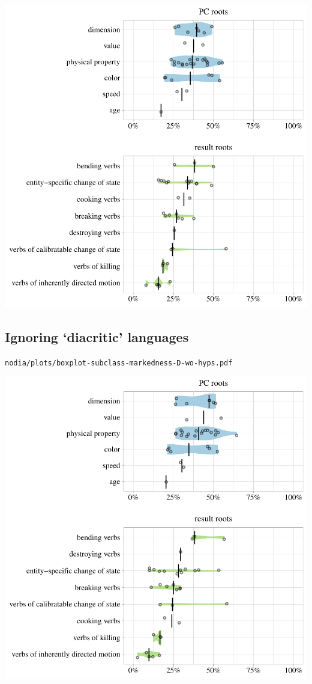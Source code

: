 \includegraphics[width=1.0\textwidth]{../nolow/plots/boxplot-subclass-markedness-D-wo-hyps.pdf}

\subsection{Ignoring `diacritic' languages}

\texttt{nodia/plots/boxplot-subclass-markedness-D-wo-hyps.pdf}

\includegraphics[width=1.0\textwidth]{../nodia/plots/boxplot-subclass-markedness-D-wo-hyps.pdf}


